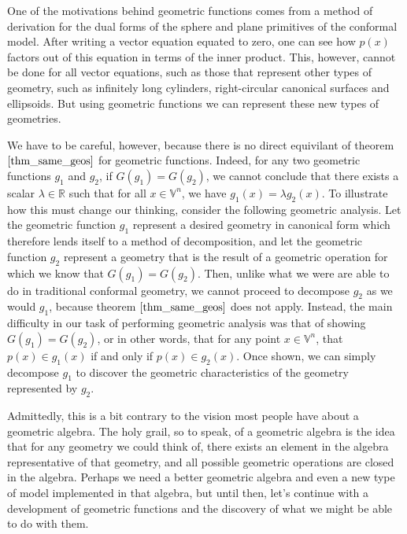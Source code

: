 \documentclass[12pt]{article}
\newcommand{\V}{\mathbb{V}}
\newcommand{\R}{\mathbb{R}}
\begin{document}
One of the motivations behind geometric functions comes from a method
of derivation for the dual forms of the sphere and plane primitives of
the conformal model.  After writing a vector equation equated to zero,
one can see how $p(x)$ factors out of this equation in terms of the inner product.  This, however, cannot
be done for all vector equations, such as those that represent other types
of geometry, such as infinitely long cylinders, right-circular canonical surfaces
and ellipsoids.  But using geometric functions we can represent these new types
of geometries.

We have to be careful, however, because there is no direct equivilant
of theorem $\eqref{thm_same_geos}$ for geometric functions.
Indeed, for any two geometric functions $g_1$ and $g_2$, if $G(g_1)=G(g_2)$,
we cannot conclude that there exists a scalar $\lambda\in\R$ such that for all
$x\in\V^n$, we have $g_1(x)=\lambda g_2(x)$.  To illustrate how this
must change our thinking, consider the following geometric analysis.
Let the geometric function $g_1$ represent a desired geometry in canonical
form which therefore lends itself to a method of decomposition, and let the geometric function $g_2$ represent a geometry that
is the result of a geometric operation for which we know that $G(g_1)=G(g_2)$.
Then, unlike what we were are able to do in traditional conformal geometry, we cannot
proceed to decompose $g_2$ as we would $g_1$, because theorem $\eqref{thm_same_geos}$
does not apply.  Instead, the main difficulty in our task of performing geometric analysis
was that of showing $G(g_1)=G(g_2)$, or in other words, that for any point $x\in\V^n$, that $p(x)\in g_1(x)$
if and only if $p(x)\in g_2(x)$.  Once shown, we can simply decompose $g_1$ to discover
the geometric characteristics of the geometry represented by $g_2$.

Admittedly, this is a bit contrary to the vision most people have about
a geometric algebra.  The holy grail, so to speak, of a geometric algebra
is the idea that for any geometry we could think of, there exists an element
in the algebra representative of that geometry, and all possible geometric
operations are closed in the algebra.  Perhaps we need a better geometric algebra
and even a new type of model implemented in that algebra, but until then,
let's continue with a development of geometric functions and the discovery
of what we might be able to do with them.

\end{document}
